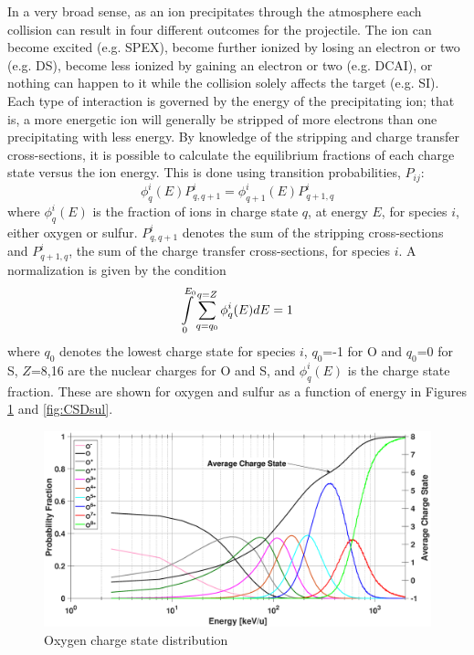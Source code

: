 \documentclass[draft]{agujournal2018}
\begin{document}
In a very broad sense, as an ion precipitates through the atmosphere each collision can result in four different outcomes for the projectile.
The ion can become excited (e.g. SPEX), become further ionized by losing an electron or two (e.g. DS), become less ionized by gaining an electron or two (e.g. DCAI), or nothing can happen to it while the collision solely affects the target (e.g. SI).
Each type of interaction is governed by the energy of the precipitating ion; that is, a more energetic ion will generally be stripped of more electrons than one precipitating with less energy.
By knowledge of the stripping and charge transfer cross-sections, it is possible to calculate the equilibrium fractions of each charge state versus the ion energy.
This is done using transition probabilities, $P_{ij}$:
\begin{equation}
    \phi_{q}^{i}(E) P^i_{q,q+1}=\phi_{q+1}^{i}(E) P^i_{q+1,q}
    \label{eqn:EqProb}
\end{equation}
where $\phi_q^i(E)$ is the fraction of ions in charge state $q$, at energy $E$, for species $i$, either oxygen or sulfur.
$P^i_{q,q+1}$ denotes the sum of the stripping cross-sections and $P^i_{q+1,q}$, the sum of the charge transfer cross-sections, for species $i$.
A normalization is given by the condition
\begin{equation}
    \int\displaylimits_{0}^{E_0}\sum_{q=q_0}^{q=Z}\phi^i_q(E)dE=1
    \label{eqn:EqProbNorm}
\end{equation}
where $q_0$ denotes the lowest charge state for species $i$, $q_0$=-1 for O and $q_0$=0 for S, $Z$=8,16 are the nuclear charges for O and S, and $\phi_q^i(E)$ is the charge state fraction.
These are shown for oxygen and sulfur as a function of energy in Figures \ref{fig:CSDoxy} and \ref{fig:CSDsul}.

\begin{figure}[ht]
    \centering
    \includegraphics[width=\textwidth]{Figures/CSDoxy.eps}
    \caption{Oxygen charge state distribution}
    \label{fig:CSDoxy}
\end{figure}
\end{document}
